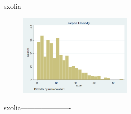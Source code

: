 \documentclass{article}
\begin{document}
	\vspace {0.5\baselineskip}
	
	sxolia------------------------
	
	\vspace {0.5\baselineskip}
	
	\begin{figure}
		\centering
		\includegraphics[width=0.5\textwidth]{exper density.png}
		\caption{\label{fig:plot} }
	\end{figure}
	
	\vspace {0.5\baselineskip}
	
	sxolia----------------------
	
	\vspace {0.5\baselineskip}
	
\end{document}

